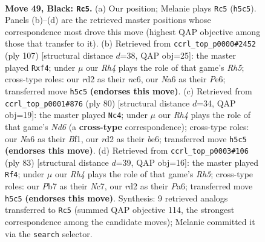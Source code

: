 \documentclass[11pt]{article}
\begin{document}
\clearpage

\begin{figure}[p]\centering
\begin{subfigure}{0.46\textwidth}\centering
\resizebox{\linewidth}{!}{%
\newchessgame
\chessboard[
  setfen={6k1/1p2p3/n5pp/pN5r/P1p5/2P2PK1/1B1R4/8 b - - 4 49},
  showmover=false,
  pgfstyle=straightmove, color=movearrow, markmove={h5-c5}
]}
\caption{}
\end{subfigure}\hfill
\begin{subfigure}{0.46\textwidth}\centering
\resizebox{\linewidth}{!}{%
\newchessgame
\chessboard[
  setfen={8/5p1k/2N1p3/5p1p/4nP1r/PP1R4/K1P5/8 b - - 3 54},
  showmover=false,
  pgfstyle=straightmove, color=movearrow, markmove={h4-f4}
]}
\caption{}
\end{subfigure}
\\[4pt]
\begin{subfigure}{0.46\textwidth}\centering
\resizebox{\linewidth}{!}{%
\newchessgame
\chessboard[
  setfen={6k1/1p2r3/2pNb1p1/p3P1P1/Pn2R3/6K1/1P6/5B2 w - - 5 41},
  showmover=false,
  pgfstyle=straightmove, color=movearrow, markmove={d6-c4}
]}
\caption{}
\end{subfigure}\hfill
\begin{subfigure}{0.46\textwidth}\centering
\resizebox{\linewidth}{!}{%
\newchessgame
\chessboard[
  setfen={8/2n1k3/p1p3p1/P6p/1P2N2r/2P2P2/1K6/4R3 b - - 0 42},
  showmover=false,
  pgfstyle=straightmove, color=movearrow, markmove={h4-f4}
]}
\caption{}
\end{subfigure}
\caption{\textbf{Move 49, Black: \texttt{Rc5}.} (a) Our position; Melanie plays \texttt{Rc5} (\texttt{h5c5}). Panels (b)--(d) are the retrieved master positions whose correspondence most drove this move (highest QAP objective among those that transfer to it). (b) Retrieved from \texttt{ccrl\_top\_p0000\#2452} (ply 107) [structural distance $d$=38, QAP obj=25]: the master played \texttt{Rxf4}; under $\mu$ our \emph{Rh4} plays the role of that game's \emph{Rh5}; cross-type roles: our \emph{r}d2 as their \emph{n}c6, our \emph{N}a6 as their \emph{P}e6; transferred move \texttt{h5c5} \textbf{(endorses this move)}. (c) Retrieved from \texttt{ccrl\_top\_p0001\#876} (ply 80) [structural distance $d$=34, QAP obj=19]: the master played \texttt{Nc4}; under $\mu$ our \emph{Rh4} plays the role of that game's \emph{Nd6} (a \textbf{cross-type} correspondence); cross-type roles: our \emph{N}a6 as their \emph{B}f1, our \emph{r}d2 as their \emph{b}e6; transferred move \texttt{h5c5} \textbf{(endorses this move)}. (d) Retrieved from \texttt{ccrl\_top\_p0003\#106} (ply 83) [structural distance $d$=39, QAP obj=16]: the master played \texttt{Rf4}; under $\mu$ our \emph{Rh4} plays the role of that game's \emph{Rh5}; cross-type roles: our \emph{P}b7 as their \emph{N}c7, our \emph{r}d2 as their \emph{P}a6; transferred move \texttt{h5c5} \textbf{(endorses this move)}. Synthesis: 9 retrieved analogs transferred to \texttt{Rc5} (summed QAP objective 114, the strongest correspondence among the candidate moves); Melanie committed it via the \texttt{search} selector.}
\label{fig:thought-m97}
\end{figure}
\end{document}

